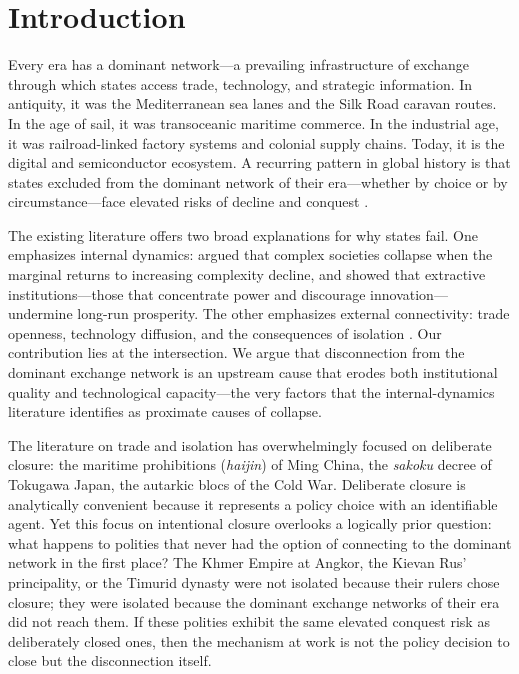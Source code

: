 \documentclass[pdflatex,sn-basic]{sn-jnl}
\theoremstyle{thmstyleone}%
\theoremstyle{thmstyletwo}%
\theoremstyle{thmstylethree}%
\begin{document}
\section{Introduction}\label{sec:intro}

Every era has a dominant network---a prevailing infrastructure of exchange through which states access trade, technology, and strategic information. In antiquity, it was the Mediterranean sea lanes and the Silk Road caravan routes. In the age of sail, it was transoceanic maritime commerce. In the industrial age, it was railroad-linked factory systems and colonial supply chains. Today, it is the digital and semiconductor ecosystem. A recurring pattern in global history is that states excluded from the dominant network of their era---whether by choice or by circumstance---face elevated risks of decline and conquest \citep{Kennedy1987, FindlayORourke2007}.

The existing literature offers two broad explanations for why states fail. One emphasizes internal dynamics: \citet{Tainter1988} argued that complex societies collapse when the marginal returns to increasing complexity decline, and \citet{AcemogluRobinson2012} showed that extractive institutions---those that concentrate power and discourage innovation---undermine long-run prosperity. The other emphasizes external connectivity: trade openness, technology diffusion, and the consequences of isolation \citep{FindlayORourke2007, Mokyr2002}. Our contribution lies at the intersection. We argue that disconnection from the dominant exchange network is an upstream cause that erodes both institutional quality and technological capacity---the very factors that the internal-dynamics literature identifies as proximate causes of collapse.

The literature on trade and isolation has overwhelmingly focused on deliberate closure: the maritime prohibitions (\emph{haijin}) of Ming China, the \emph{sakoku} decree of Tokugawa Japan, the autarkic blocs of the Cold War. Deliberate closure is analytically convenient because it represents a policy choice with an identifiable agent. Yet this focus on intentional closure overlooks a logically prior question: what happens to polities that never had the option of connecting to the dominant network in the first place? The Khmer Empire at Angkor, the Kievan Rus' principality, or the Timurid dynasty were not isolated because their rulers chose closure; they were isolated because the dominant exchange networks of their era did not reach them. If these polities exhibit the same elevated conquest risk as deliberately closed ones, then the mechanism at work is not the policy decision to close but the disconnection itself.
\end{document}
